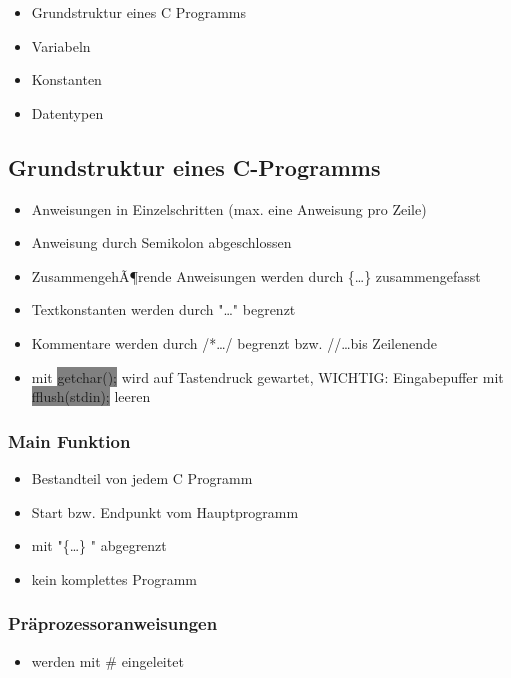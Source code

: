 \documentclass[10pt,a5paper]{article}
\newcommand{\cbg}[1]{\colorbox{grey}{#1}}
\begin{document}
\begin{itemize}
\item Grundstruktur eines C Programms
\item Variabeln
\item Konstanten
\item Datentypen
\end{itemize}

\newpage 
\subsection{Grundstruktur eines C-Programms}
 \begin{itemize}
 \item Anweisungen in Einzelschritten (max. eine Anweisung pro Zeile)
 \item Anweisung durch Semikolon abgeschlossen
 \item ZusammengehÃ¶rende Anweisungen werden durch \{\dots\} zusammengefasst
 \item Textkonstanten werden durch "\dots" begrenzt
 \item Kommentare werden durch /*\dots*/ begrenzt bzw. //\dots bis Zeilenende
 \item mit \cbg{getchar();} wird auf Tastendruck gewartet, WICHTIG: Eingabepuffer mit \cbg{fflush(stdin);} leeren
 \end{itemize}
\subsubsection{Main Funktion}
\begin{itemize}
\item Bestandteil von jedem C Programm
\item Start bzw. Endpunkt vom Hauptprogramm
\item mit "\{\dots\} " abgegrenzt
\item kein komplettes Programm
\end{itemize}
\subsubsection{Präprozessoranweisungen }
\begin{itemize}
\item werden mit \# eingeleitet
\end{itemize}
\end{document}
